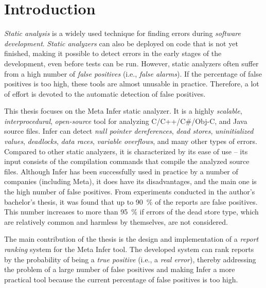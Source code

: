 \chapter{Introduction}
\textit{Static analysis} is a widely used technique for finding errors during \textit{software development}. \textit{Static analyzers} can also be deployed on code that is not yet finished, making it possible to detect errors in the early stages of the development, even before tests can be run. However, static analyzers often suffer from a high number of \textit{false positives} (i.e., \textit{false alarms}). If the percentage of false positives is too high, these tools are almost unusable in practice. Therefore, a lot of effort is devoted to the automatic detection of false positives.

This thesis focuses on the Meta Infer static analyzer. It is a highly \textit{scalable}, \textit{interprocedural}, \textit{open-source} tool for analyzing C/C++/C\#/Obj-C, and Java source files. Infer can detect \textit{null pointer dereferences}, \textit{dead stores}, \textit{uninitialized values}, \textit{deadlocks}, \textit{data races}, \textit{variable overflows}, and many other types of errors. Compared to other static analyzers, it is characterized by its ease of use -- its input consists of the compilation commands that compile the analyzed source files. Although Infer has been successfully used in practice by a number of companies (including Meta), it does have its disadvantages, and the main one is the high number of false positives. From experiments conducted in the author's bachelor's thesis, it was found that up to 90~\% of the reports are false positives. This number increases to more than 95~\% if errors of the dead store type, which are relatively common and harmless by themselves, are not considered.

The main contribution of the thesis is the design and implementation of a \textit{report ranking} system for the Meta Infer tool. The developed system can rank reports by the probability of being a \textit{true positive} (i.e., a \textit{real error}), thereby addressing the problem of a large number of false positives and making Infer a more practical tool because the current percentage of false positives is too high.

